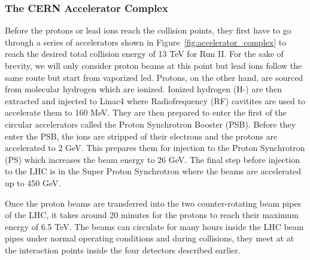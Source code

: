 \subsubsection{The CERN Accelerator Complex}

Before the protons or lead ions reach the collision points, they first have to go through a series of accelerators shown in Figure~\ref{fig:accelerator_complex} to reach the desired total collision energy of 13 TeV for Run II. For the sake of brevity, we will only consider proton beams at this point but lead ions follow the same route but start from vaporized led. Protons, on the other hand, are sourced from molecular hydrogen which are ionized. Ionized hydrogen (H-) are then extracted and injected to Linac4 where Radiofrequency (RF) cavitites are used to accelerate them to 160 MeV. They are then prepared to enter the first of the circular accelerators called the Proton Synchrotron Booster (PSB). Before they enter the PSB, the ions are stripped of their electrons and the protons are accelerated to 2 GeV. This prepares them for injection to the Proton Synchrotron (PS) which increases the beam energy to 26 GeV. The final step before injection to the LHC is in the Super Proton Synchrotron where the beams are accelerated up to 450 GeV. 


Once the proton beams are transferred into the two counter-rotating beam pipes of the LHC, it takes around 20 minutes for the protons to reach their maximum energy of 6.5 TeV. The beams can circulate for many hours inside the LHC beam pipes under normal operating conditions and during collisions, they meet at at the interaction points inside the four detectors described earlier. 



